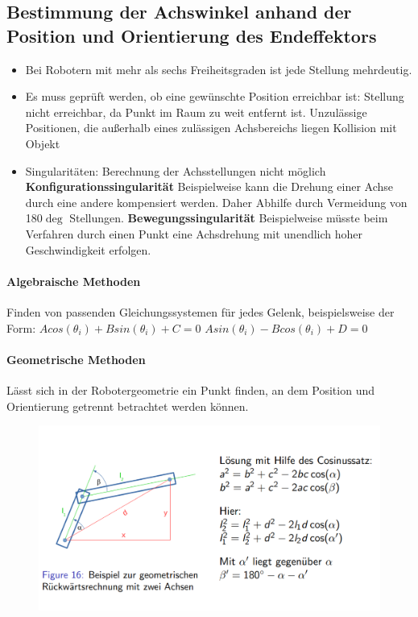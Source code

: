 \subsection{Bestimmung der Achswinkel anhand der Position und Orientierung des Endeffektors}
\begin{itemize}
	\item Bei Robotern mit mehr als sechs Freiheitsgraden ist jede Stellung mehrdeutig.
	\item Es muss geprüft werden, ob eine gewünschte Position erreichbar ist:
	\subitem Stellung nicht erreichbar, da Punkt im Raum zu weit entfernt ist.
	\subitem Unzulässige Positionen, die außerhalb eines zulässigen Achsbereichs liegen
	\subitem Kollision mit Objekt
	\item Singularitäten: Berechnung der Achsstellungen nicht möglich
	\subitem \textbf{Konfigurationssingularität} Beispielweise kann die Drehung einer Achse durch eine andere kompensiert werden.
	Daher Abhilfe durch Vermeidung von 180$\deg$ Stellungen.
	\subitem \textbf{Bewegungssingularität} Beispielweise müsste beim Verfahren durch einen Punkt eine Achsdrehung mit unendlich hoher Geschwindigkeit erfolgen.
\end{itemize}
\paragraph{Algebraische Methoden}
Finden von passenden Gleichungssystemen für jedes Gelenk, beispielsweise der Form:
	$A cos(\theta_i) + B sin(\theta_i) + C = 0$
	$A sin(\theta_i) - B cos(\theta_i) + D = 0$
\paragraph{Geometrische Methoden}
Lässt sich in der Robotergeometrie ein Punkt finden, an dem Position und Orientierung getrennt betrachtet werden können.
\begin{figure}[H]
	\begin{center}
		\includegraphics[scale=0.5]{resources/PNG/rueckwaertsrechnung.PNG}
		\caption{}
		\label{fig:resources/PNG/rueckwaertsrechnung.PNG}
	\end{center}
\end{figure}
